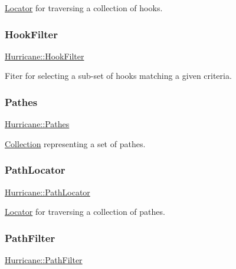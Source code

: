 \hyperlink{classHurricane_1_1Locator}{Locator} for traversing a collection of hooks. \mbox{\label{namespaceHurricane_a9287de05984b91e55592a77e8d394324}} 
\subsubsection{\texorpdfstring{Hook\+Filter}{HookFilter}}
{\footnotesize\ttfamily \hyperlink{namespaceHurricane_a9287de05984b91e55592a77e8d394324}{Hurricane\+::\+Hook\+Filter}}

Fiter for selecting a sub-\/set of hooks matching a given criteria. \mbox{\label{namespaceHurricane_a77e8a0f11b7d0d65a47a592f7bdfd061}} 
\subsubsection{\texorpdfstring{Pathes}{Pathes}}
{\footnotesize\ttfamily \hyperlink{namespaceHurricane_a77e8a0f11b7d0d65a47a592f7bdfd061}{Hurricane\+::\+Pathes}}

\hyperlink{classHurricane_1_1Collection}{Collection} representing a set of pathes. \mbox{\label{namespaceHurricane_a4077fe144cc9efa686ec63667b7dd9bf}} 
\subsubsection{\texorpdfstring{Path\+Locator}{PathLocator}}
{\footnotesize\ttfamily \hyperlink{namespaceHurricane_a4077fe144cc9efa686ec63667b7dd9bf}{Hurricane\+::\+Path\+Locator}}

\hyperlink{classHurricane_1_1Locator}{Locator} for traversing a collection of pathes. \mbox{\label{namespaceHurricane_af42ed7a6acaba43b9d5f30b789105bc1}} 
\subsubsection{\texorpdfstring{Path\+Filter}{PathFilter}}
{\footnotesize\ttfamily \hyperlink{namespaceHurricane_af42ed7a6acaba43b9d5f30b789105bc1}{Hurricane\+::\+Path\+Filter}}


